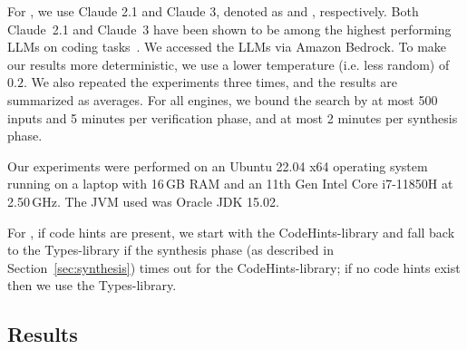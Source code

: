 \documentclass[sigconf]{acmart}
\begin{document}
For \llm, we use Claude 2.1 and Claude 3, denoted as \llma and \llmb, respectively.
Both Claude~2.1 and Claude~3 have been shown to be
among the highest performing LLMs on coding tasks~\cite{DBLP:journals/corr/abs-2405-11514,jiang2024surveylargelanguagemodels,hou2024comparinglargelanguagemodels,murr2023testingllmscodegeneration}.
We accessed the LLMs via Amazon Bedrock.
To make our results more deterministic, we use a lower temperature (i.e. less random) of $0.2$. We also repeated the experiments three times, and the results are summarized as averages.
%
For all engines, we bound the search by at most 500 inputs and 5 minutes per verification phase, and at
most 2 minutes per synthesis phase.

Our experiments were performed on an Ubuntu
22.04 x64 operating system running on a laptop with 16\,GB RAM and
an 11th Gen Intel Core i7-11850H at 2.50\,GHz.  The JVM used was Oracle JDK 15.02.


For \tool, if code hints are present, we start with the CodeHints-library and fall back to the Types-library if the synthesis phase (as described in Section~\ref{sec:synthesis}) times out for the CodeHints-library; if no code hints exist then we use the Types-library.

\subsection{Results}

\end{document}
